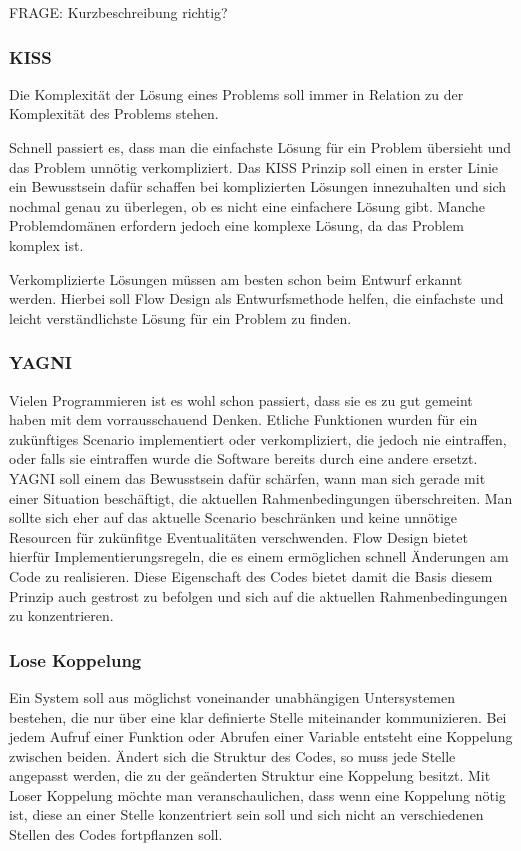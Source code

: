 \documentclass[11pt]{article}
\begin{document}
FRAGE: Kurzbeschreibung richtig?

\subsubsection{KISS}
\label{sec:orgheadline2}
Die Komplexität der Lösung eines Problems soll immer in Relation zu der
Komplexität des Problems stehen.

Schnell passiert es, dass man die einfachste Lösung für ein Problem übersieht und das Problem unnötig verkompliziert.
Das KISS Prinzip soll einen in erster Linie ein Bewusstsein dafür schaffen bei
komplizierten Lösungen innezuhalten und sich nochmal genau zu
überlegen, ob es nicht eine einfachere Lösung gibt.
Manche Problemdomänen erfordern jedoch eine komplexe Lösung, da das Problem
komplex ist.

Verkomplizierte Lösungen müssen am besten schon beim Entwurf erkannt werden.
Hierbei soll Flow Design als Entwurfsmethode helfen, die einfachste und leicht
verständlichste Lösung für ein Problem zu finden.

\subsubsection{YAGNI}
\label{sec:orgheadline3}
Vielen Programmieren ist es wohl schon passiert, dass sie es zu gut gemeint
haben mit dem vorrausschauend Denken. Etliche Funktionen wurden für ein
zukünftiges Scenario implementiert oder verkompliziert, die jedoch nie
eintraffen, oder falls sie eintraffen wurde die Software bereits durch eine
andere ersetzt.
YAGNI soll einem das Bewusstsein dafür schärfen, wann man sich gerade mit einer 
Situation beschäftigt, die aktuellen Rahmenbedingungen überschreiten.
Man sollte sich eher auf das aktuelle Scenario beschränken  und keine unnötige Resourcen für zukünfitge 
Eventualitäten verschwenden.
Flow Design bietet hierfür Implementierungsregeln, die es einem ermöglichen
schnell Änderungen am Code zu realisieren.
Diese Eigenschaft des Codes bietet damit die Basis diesem Prinzip auch gestrost
zu befolgen und sich auf die aktuellen Rahmenbedingungen zu konzentrieren.

\subsubsection{Lose Koppelung}
\label{sec:orgheadline4}
Ein System soll aus möglichst voneinander unabhängigen Untersystemen bestehen,
die nur über eine  klar definierte Stelle miteinander kommunizieren.
Bei jedem Aufruf einer Funktion oder Abrufen einer Variable entsteht eine
Koppelung zwischen beiden.
Ändert sich die Struktur des Codes, so muss jede Stelle angepasst werden, die zu
der geänderten Struktur eine Koppelung besitzt. Mit Loser Koppelung möchte man
veranschaulichen, dass wenn eine Koppelung nötig ist, diese an einer Stelle konzentriert sein soll und
sich nicht an verschiedenen Stellen des Codes fortpflanzen soll.
\end{document}
